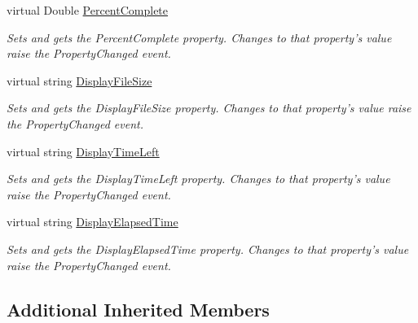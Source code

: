 \begin{DoxyCompactItemize}
virtual Double \hyperlink{class_cloud_api_public_1_1_event_message_receiver_1_1_status_1_1_c_l_status_file_transfer_base_3_01_t_01_4_a87dbed3acb80ba6ee5537f72db56a3b5}{Percent\-Complete}
\begin{DoxyCompactList}\small\item\em Sets and gets the Percent\-Complete property. Changes to that property's value raise the Property\-Changed event. \end{DoxyCompactList}\item 
virtual string \hyperlink{class_cloud_api_public_1_1_event_message_receiver_1_1_status_1_1_c_l_status_file_transfer_base_3_01_t_01_4_a2641d33254dfd9e214cea124a567f5f4}{Display\-File\-Size}
\begin{DoxyCompactList}\small\item\em Sets and gets the Display\-File\-Size property. Changes to that property's value raise the Property\-Changed event. \end{DoxyCompactList}\item 
virtual string \hyperlink{class_cloud_api_public_1_1_event_message_receiver_1_1_status_1_1_c_l_status_file_transfer_base_3_01_t_01_4_a4f0c2965e2912df7055003da9f5e8f09}{Display\-Time\-Left}
\begin{DoxyCompactList}\small\item\em Sets and gets the Display\-Time\-Left property. Changes to that property's value raise the Property\-Changed event. \end{DoxyCompactList}\item 
virtual string \hyperlink{class_cloud_api_public_1_1_event_message_receiver_1_1_status_1_1_c_l_status_file_transfer_base_3_01_t_01_4_ab5f586d4dbd56f0ec9d461c36744579f}{Display\-Elapsed\-Time}
\begin{DoxyCompactList}\small\item\em Sets and gets the Display\-Elapsed\-Time property. Changes to that property's value raise the Property\-Changed event. \end{DoxyCompactList}\end{DoxyCompactItemize}
\subsection*{Additional Inherited Members}



